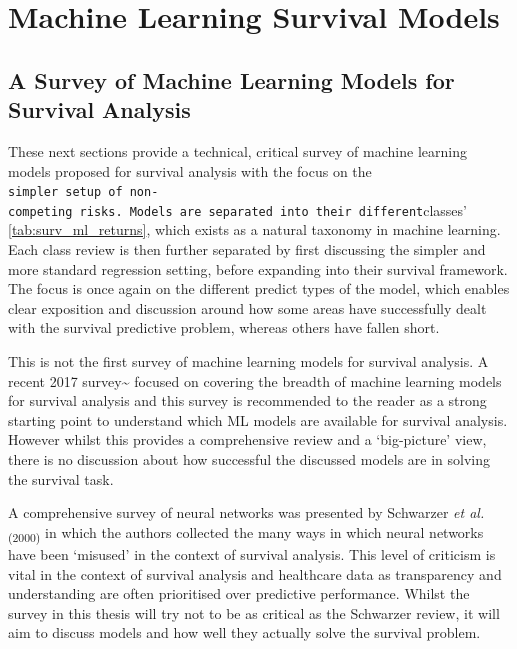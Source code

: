 \documentclass[
  letterpaper,
]{scrbook}
\theoremstyle{plain}
\theoremstyle{definition}
\theoremstyle{remark}
\begin{document}

\hypertarget{machine-learning-survival-models}{%
\chapter{Machine Learning Survival
Models}\label{machine-learning-survival-models}}

\section{A Survey of Machine Learning Models for Survival Analysis}
\label{sec:surv_ml}

These next sections provide a technical, critical survey of machine
learning models proposed for survival analysis with the focus on the
\texttt{simpler\textquotesingle{}\ setup\ of\ non-competing\ risks.\ Models\ are\ separated\ into\ their\ different}classes'
\ref{tab:surv_ml_returns}, which exists as a natural taxonomy in machine
learning. Each class review is then further separated by first
discussing the simpler and more standard regression setting, before
expanding into their survival framework. The focus is once again on the
different predict types of the model, which enables clear exposition and
discussion around how some areas have successfully dealt with the
survival predictive problem, whereas others have fallen short.

This is not the first survey of machine learning models for survival
analysis. A recent 2017 survey\textasciitilde{}\cite{Wang2017} focused
on covering the breadth of machine learning models for survival analysis
and this survey is recommended to the reader as a strong starting point
to understand which ML models are available for survival analysis.
However whilst this provides a comprehensive review and a `big-picture'
view, there is no discussion about how successful the discussed models
are in solving the survival task.

A comprehensive survey of neural networks was presented by Schwarzer
\textit{et al.}\textsubscript{(2000)}\cite{Schwarzer2000} in which the
authors collected the many ways in which neural networks have been
`misused' in the context of survival analysis. This level of criticism
is vital in the context of survival analysis and healthcare data as
transparency and understanding are often prioritised over predictive
performance. Whilst the survey in this thesis will try not to be as
critical as the Schwarzer review, it will aim to discuss models and how
well they actually solve the survival problem.
\end{document}
